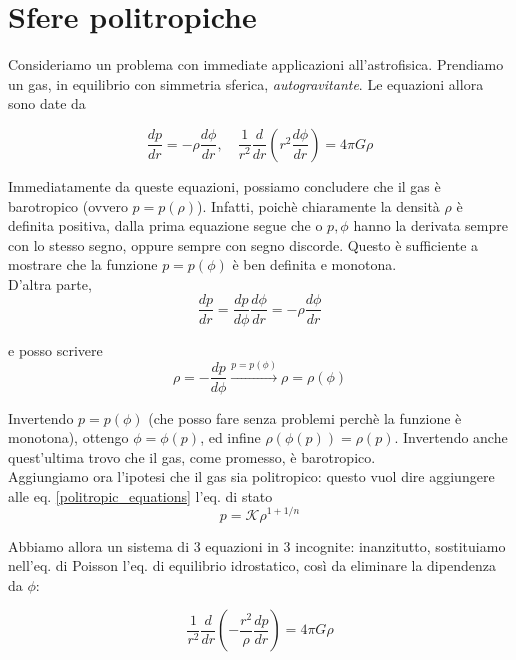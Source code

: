 \documentclass{report}
\begin{document}
\section{Sfere politropiche}

Consideriamo un problema con immediate applicazioni all'astrofisica. Prendiamo un gas, in equilibrio con simmetria sferica, \emph{autogravitante}. Le equazioni allora sono date da 

\begin{equation}
    \label{politropic_equations}
    \frac{dp}{dr} = -\rho \frac{d\phi}{dr},  \quad \frac{1}{r^2}\frac{d}{dr}\left(r^2 \frac{d\phi}{dr} \right) = 4\pi G \rho
\end{equation}

Immediatamente da queste equazioni, possiamo concludere che il gas è barotropico (ovvero $p=p(\rho)$). Infatti, poichè chiaramente la densità $\rho$ è definita positiva, dalla prima equazione segue che o $p, \phi$ hanno la derivata sempre con lo stesso segno, oppure sempre con segno discorde. Questo è sufficiente a mostrare che la funzione $p=p(\phi)$ è ben definita e monotona. \\
D'altra parte, 
\begin{equation}
    \frac{dp}{dr} = \frac{dp}{d\phi}\frac{d\phi}{dr} = -\rho \frac{d\phi}{dr}
\end{equation}

e posso scrivere 
\begin{equation}
    \rho = -\frac{dp}{d\phi} \xrightarrow{p=p(\phi)} \rho = \rho(\phi)
\end{equation}

Invertendo $p=p(\phi)$ (che posso fare senza problemi perchè la funzione è monotona), ottengo $\phi = \phi(p)$, ed infine $\rho(\phi(p)) = \rho(p)$. Invertendo anche quest'ultima trovo che il gas, come promesso, è barotropico. \\

Aggiungiamo ora l'ipotesi che il gas sia politropico: questo vuol dire aggiungere alle eq. \ref{politropic_equations} l'eq. di stato 
\begin{equation}
    p = \mathcal{K}\rho^{1 + 1/n}
\end{equation}

Abbiamo allora un sistema di 3 equazioni in 3 incognite: inanzitutto, sostituiamo nell'eq. di Poisson l'eq. di equilibrio idrostatico, così da eliminare la dipendenza da $\phi$: 

\begin{equation}
    \frac{1}{r^2}\frac{d}{dr}\left(-\frac{r^2}{\rho} \frac{dp}{dr}\right) = 4\pi G\rho 
\end{equation}
\end{document}
